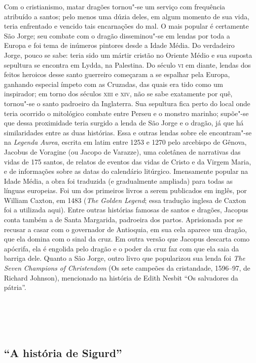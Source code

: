 Com o cristianismo, matar dragões tornou"-se um serviço com frequência
atribuído a santos; pelo menos uma dúzia deles, em algum
momento de sua vida, teria enfrentado e vencido tais encarnações do
mal. O mais popular é certamente São Jorge; seu combate com o dragão
disseminou"-se em lendas por toda a Europa e foi tema de inúmeros
pintores desde a Idade Média. Do verdadeiro Jorge, pouco se sabe:
teria sido um mártir cristão no Oriente Médio e sua suposta
sepultura se encontra em Lydda, na Palestina. Do século \textsc{vi} em diante,
lendas dos feitos heroicos desse santo guerreiro começaram a se
espalhar pela Europa, ganhando especial ímpeto com as Cruzadas, das
quais era tido como um inspirador; em torno dos séculos \textsc{xiii} e \textsc{xiv},
não se sabe exatamente por quê, tornou"-se o santo padroeiro da
Inglaterra. Sua sepultura fica perto do local onde teria ocorrido o
mitológico combate entre Perseu e o monstro marinho; supõe"-se que
dessa proximidade teria surgido a lenda de São Jorge e o dragão, já
que há similaridades entre as duas histórias. Essa e outras lendas
sobre ele encontram"-se na \textit{Legenda Aurea}, escrita em latim entre 1253
e 1270 pelo arcebispo de Gênova, Jacobus de Voragine (ou Jacopo de
Varazze), uma coletânea de narrativas das vidas de 175 santos, de
relatos de eventos das vidas de Cristo e da Virgem Maria, e de
informações sobre as datas do calendário litúrgico. Imensamente
popular na Idade Média, a obra foi traduzida (e gradualmente
ampliada) para todas as línguas europeias. Foi um dos primeiros livros
a serem publicados em inglês, por William Caxton, em 1483 (\textit{The Golden
Legend}; essa tradução inglesa de Caxton foi a utilizada aqui). Entre
outras histórias famosas de santos e dragões, Jacopus conta também a
de Santa Margarida, padroeira dos partos. Aprisionada por se recusar
a casar com o governador de Antioquia, em sua cela aparece um dragão,
que ela domina com o sinal da cruz. Em outra versão que Jacopus
descarta como apócrifa, ela é engolida pelo dragão e o poder da cruz
faz com que ela saia da barriga dele. Quanto a São Jorge, outro livro
que popularizou sua lenda foi \textit{The Seven Champions of Christendom} (Os
sete campeões da cristandade, 1596--97, de Richard Johnson), 
mencionado na história de Edith Nesbit “Os salvadores da pátria”. 

\chapter*{\ }

\section{“A história de Sigurd”} 

